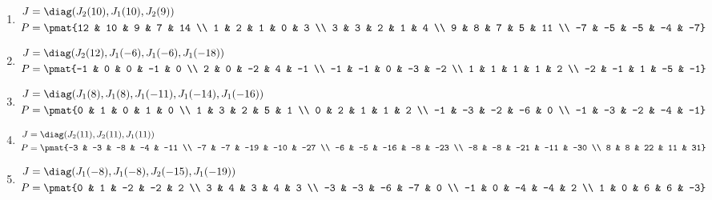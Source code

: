 \begin{enumerate}
\item

\begin{align*}
J &= \diag(J_{2}(10), J_{1}(10), J_{2}(9))\\
P &= \pmat{12 & 10 & 9 & 7 & 14 \\ 1 & 2 & 1 & 0 & 3 \\ 3 & 3 & 2 & 1 & 4 \\ 9 & 8 & 7 & 5 & 11 \\ -7 & -5 & -5 & -4 & -7}
\end{align*}

\item

\begin{align*}
J &= \diag(J_{2}(12), J_{1}(-6), J_{1}(-6), J_{1}(-18))\\
P &= \pmat{-1 & 0 & 0 & -1 & 0 \\ 2 & 0 & -2 & 4 & -1 \\ -1 & -1 & 0 & -3 & -2 \\ 1 & 1 & 1 & 1 & 2 \\ -2 & -1 & 1 & -5 & -1}
\end{align*}

\item

\begin{align*}
J &= \diag(J_{1}(8), J_{1}(8), J_{1}(-11), J_{1}(-14), J_{1}(-16))\\
P &= \pmat{0 & 1 & 0 & 1 & 0 \\ 1 & 3 & 2 & 5 & 1 \\ 0 & 2 & 1 & 1 & 2 \\ -1 & -3 & -2 & -6 & 0 \\ -1 & -3 & -2 & -4 & -1}
\end{align*}

\item

\begin{align*}
J &= \diag(J_{2}(11), J_{2}(11), J_{1}(11))\\
P &= \pmat{-3 & -3 & -8 & -4 & -11 \\ -7 & -7 & -19 & -10 & -27 \\ -6 & -5 & -16 & -8 & -23 \\ -8 & -8 & -21 & -11 & -30 \\ 8 & 8 & 22 & 11 & 31}
\end{align*}

\item

\begin{align*}
J &= \diag(J_{1}(-8), J_{1}(-8), J_{2}(-15), J_{1}(-19))\\
P &= \pmat{0 & 1 & -2 & -2 & 2 \\ 3 & 4 & 3 & 4 & 3 \\ -3 & -3 & -6 & -7 & 0 \\ -1 & 0 & -4 & -4 & 2 \\ 1 & 0 & 6 & 6 & -3}
\end{align*}


\end{enumerate}
